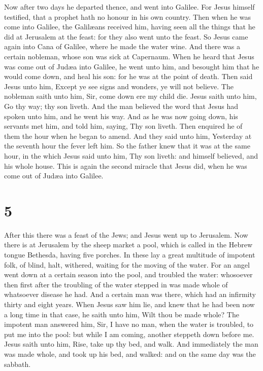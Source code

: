  Now after two days he departed thence, and went into
Galilee.  For Jesus himself testified, that a prophet hath
no honour in his own country.  Then when he was come into
Galilee, the Galilæans received him, having seen all the things that he
did at Jerusalem at the feast: for they also went unto the feast.
 So Jesus came again into Cana of Galilee, where he made
the water wine. And there was a certain nobleman, whose son was sick at
Capernaum.  When he heard that Jesus was come out of Judæa
into Galilee, he went unto him, and besought him that he would come
down, and heal his son: for he was at the point of death. 
Then said Jesus unto him, Except ye see signs and wonders, ye will not
believe.  The nobleman saith unto him, Sir, come down ere
my child die.  Jesus saith unto him, Go thy way; thy son
liveth. And the man believed the word that Jesus had spoken unto him,
and he went his way.  And as he was now going down, his
servants met him, and told him, saying, Thy son liveth. 
Then enquired he of them the hour when he began to amend. And they said
unto him, Yesterday at the seventh hour the fever left him.
 So the father knew that it was at the same hour, in the
which Jesus said unto him, Thy son liveth: and himself believed, and his
whole house.  This is again the second miracle that Jesus
did, when he was come out of Judæa into Galilee.

\hypertarget{section-4}{%
\section{5}\label{section-4}}

 After this there was a feast of the Jews; and Jesus went up
to Jerusalem.  Now there is at Jerusalem by the sheep market
a pool, which is called in the Hebrew tongue Bethesda, having five
porches.  In these lay a great multitude of impotent folk,
of blind, halt, withered, waiting for the moving of the water.
 For an angel went down at a certain season into the pool,
and troubled the water: whosoever then first after the troubling of the
water stepped in was made whole of whatsoever disease he had.
 And a certain man was there, which had an infirmity thirty
and eight years.  When Jesus saw him lie, and knew that he
had been now a long time in that case, he saith unto him, Wilt thou be
made whole?  The impotent man answered him, Sir, I have no
man, when the water is troubled, to put me into the pool: but while I am
coming, another steppeth down before me.  Jesus saith unto
him, Rise, take up thy bed, and walk.  And immediately the
man was made whole, and took up his bed, and walked: and on the same day
was the sabbath.

